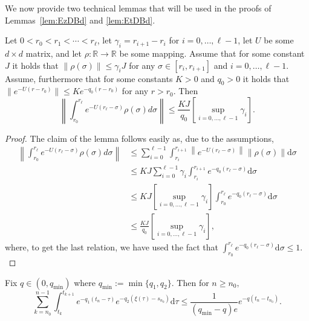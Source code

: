 \documentclass[usenames,dvipsnames,final,12pt]{colt2018} %
\newcommand{\Real}{\mathbb{R}}
\newcommand{\lt}{q_1}
\newcommand{\lz}{q_2}
\newcommand{\lmin}{q_{\min}}
\newcommand{\lm}{q}
\newcommand{\df}{\mathrm{d}}
\newcommand{\tI}[1]{t_{#1}}
\newcommand{\sI}[1]{s_{#1}}
\newcommand{\gal}[1]{#1}
\newcommand{\gugan}[1]{#1}
\begin{document}
\gal{We now provide two technical lemmas that will be used in the proofs of Lemmas~\ref{lem:EzDBd} and \ref{lem:EtDBd}.}

\begin{lemma}
	\label{lem: technical for norm of int}
	Let $0< r_0 < r_1 < \cdots < r_\ell$, let $\gamma_i = r_{i+1} - r_i$ for $i=0, \dots, \ell-1$, let $U$ be some $d \times d$ matrix, and let $\rho: \Real \to \Real$ be some mapping.
	Assume that for some constant $J$ it holds that $\|\rho(\sigma)\| \leq \gamma_i J$ for any $\sigma \in [r_i,r_{i+1}]$ and $i=0, \dots, \ell-1$.
	Assume, furthermore that for some constants $K>0$ and $q_0>0$ it holds that $\|e^{-U(r-r_0)}\| \leq Ke^{-q_0(r-r_0)}$ for any $r>r_0$.
	Then
	\[
	\left\|\int_{r_0}^{r_\ell} e^{-U(r_\ell-\sigma)}\rho(\sigma)d\sigma\right\|
	\leq
	\frac{KJ}{q_0}\left[\sup_{i=0, \dots, \ell-1} \gamma_i\right] .
	\]
\end{lemma}
\begin{proof}
	The claim of the lemma follows easily as, due to the assumptions,
	\begin{align*}
		\left\|\int_{r_0}^{r_\ell} e^{-U(r_\ell-\sigma)}\rho(\sigma)d\sigma\right\| &\leq
		\sum_{i=0}^{\ell-1} \int_{r_i}^{r_{i+1}} \left\|e^{-U(r_\ell-\sigma)}\right\|\left\|\rho(\sigma)\right\| \df \sigma
		\\
		&\leq
		KJ\sum_{i=0}^{\ell-1} \gugan{\gamma_i} \int_{r_i}^{r_{i+1}} e^{-q_0(r_\ell-\sigma)} \df \sigma
		\\
		&\leq
		KJ \left[\sup_{i=0, \dots, \ell-1} \gamma_i\right] \gugan{ \int_{r_0}^{r_\ell} e^{-q_0(r_\ell - \sigma)}\df  \sigma}
		\\
		&\leq
		\frac{KJ}{q_0} \left[\sup_{i=0, \dots, \ell-1} \gamma_i\right],
	\end{align*}
	\gugan{where, to get the last relation, we have used the fact that $\int_{r_0}^{r_\ell}e^{-q_0(r_\ell - \sigma)} \df \sigma \leq 1.$}
\end{proof}

\begin{lemma}
	\label{lem:comDRate}
	Fix $\lm \in (0, \lmin)$ where $ \lmin := \min\{\lt, \lz\}.$ Then for $n \geq n_0,$
	\[
	\sum_{k = n_0}^{n - 1} \int_{\tI{k}}^{\tI{k + 1}}e^{-\lt(\tI{n} - \tau)} e^{-\lz(\xi(\tau) - \sI{n_0})} \df \tau  \leq  \frac{1}{(\lmin-\lm)e} e^{- q(\tI{n} - \tI{n_0})}.
	\]
\end{lemma}
\end{document}
